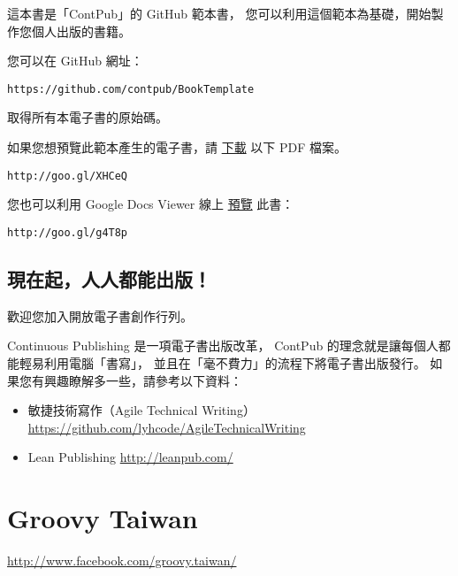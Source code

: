 \documentclass[a4paper,12pt,english]{sphinxmanual}
\begin{document}
這本書是「ContPub」的 GitHub 範本書，
您可以利用這個範本為基礎，開始製作您個人出版的書籍。

您可以在 GitHub 網址：

\begin{Verbatim}[commandchars=@\[\]]
https://github.com/contpub/BookTemplate
\end{Verbatim}

取得所有本電子書的原始碼。

如果您想預覽此範本產生的電子書，請 \href{http://goo.gl/XHCeQ}{下載} 以下 PDF 檔案。

\begin{Verbatim}[commandchars=@\[\]]
http://goo.gl/XHCeQ
\end{Verbatim}

您也可以利用 Google Docs Viewer 線上 \href{http://goo.gl/g4T8p}{預覽} 此書：

\begin{Verbatim}[commandchars=@\[\]]
http://goo.gl/g4T8p
\end{Verbatim}


\section{現在起，人人都能出版！}
\label{README:id3}
歡迎您加入開放電子書創作行列。

Continuous Publishing 是一項電子書出版改革，
ContPub 的理念就是讓每個人都能輕易利用電腦「書寫」，
並且在「毫不費力」的流程下將電子書出版發行。
如果您有興趣瞭解多一些，請參考以下資料：
\begin{itemize}
\item {} 
敏捷技術寫作（Agile Technical Writing）
\href{https://github.com/lyhcode/AgileTechnicalWriting}{https://github.com/lyhcode/AgileTechnicalWriting}

\item {} 
Lean Publishing
\href{http://leanpub.com/}{http://leanpub.com/}

\end{itemize}


\chapter{Groovy Taiwan}
\label{index:groovy-taiwan}
\href{http://www.facebook.com/groovy.taiwan/}{http://www.facebook.com/groovy.taiwan/}



\renewcommand{\indexname}{Index}
\printindex
\end{document}
